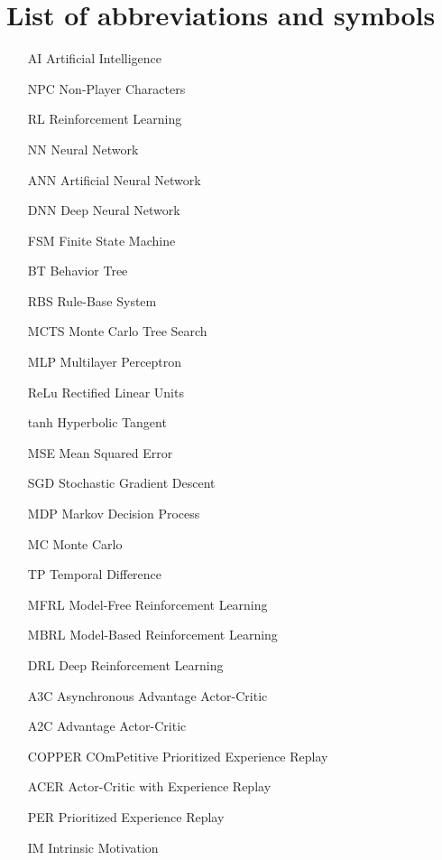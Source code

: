 \chapter{List of abbreviations and symbols}

\begin{itemize}
\item[AI] Artificial Intelligence
\item [NPC] Non-Player Characters
\item [RL] Reinforcement Learning
\item [NN] Neural Network
\item [ANN] Artificial Neural Network
\item [DNN] Deep Neural Network
\item [FSM] Finite State Machine
\item [BT] Behavior Tree
\item [RBS] Rule-Base System
\item [MCTS] Monte Carlo Tree Search
\item [MLP] Multilayer Perceptron
\item [ReLu] Rectified Linear Units
\item [tanh] Hyperbolic Tangent
\item [MSE] Mean Squared Error
\item [SGD] Stochastic Gradient Descent
\item [MDP] Markov Decision Process 
\item [MC] Monte Carlo
\item [TP] Temporal Difference
\item [MFRL] Model-Free Reinforcement Learning
\item [MBRL] Model-Based Reinforcement Learning
\item [DRL] Deep Reinforcement Learning
\item [A3C] Asynchronous Advantage Actor-Critic
\item [A2C] Advantage Actor-Critic
\item [COPPER] COmPetitive Prioritized Experience Replay
\item [ACER] Actor-Critic with Experience Replay
\item [PER] Prioritized Experience Replay
\item [IM] Intrinsic Motivation

\end{itemize}
